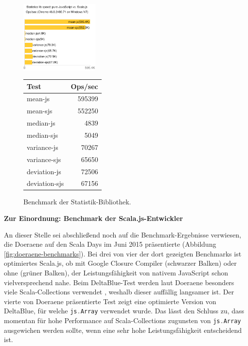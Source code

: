 \documentclass[a4paper, 12pt, hidelinks, listof=totoc, listoftables=totoc, bibliography=totoc]{scrreprt}
\newcommand{\code}[1]{\lstinline[language=Scala, style=inline]|#1|}
\newcommand{\MyMiniSec}[1]{\rmfamily\fontsize{12}{15}\selectfont
	\vspace{7pt}\textbf{#1} %
}
\begin{document}
\begin{figure}[!h]
	\centering
	\includegraphics[width=0.35\textwidth]{statistics-lib/benchmark-statistics-lib-chart}
	\qquad
	\qquad
	\begin{tabular}[b]{|l|r|}
		\hline \textbf{Test} & \textbf{Ops/sec} \\ 
		\hline mean-js       & 595399 \\ 
		\hline mean-sjs      & 552250 \\ 
		\hline median-js     & 4839 \\ 
		\hline median-sjs    & 5049 \\ 
		\hline variance-js   & 70267 \\ 
		\hline variance-sjs  & 65650 \\ 
		\hline deviation-js  & 72506 \\ 
		\hline deviation-sjs & 67156 \\ 
		\hline 
	\end{tabular}
	\captionsetup{labelformat=andtable}
	\caption{Benchmark der Statistik-Bibliothek.}
\end{figure}


\MyMiniSec{Zur Einordnung: Benchmark der Scala.js-Entwickler}

An dieser Stelle sei abschließend noch auf die Benchmark-Ergebnisse verwiesen, die Doeraene auf den Scala Days im Juni 2015 präsentierte (Abbildung \ref{fig:doeraene-benchmarks}). Bei drei von vier der dort gezeigten Benchmarks ist optimiertes Scala.js, ob mit Google Closure Compiler (schwarzer Balken) oder ohne (grüner Balken), der Leistungsfähigkeit von nativem \mbox{JavaScript} schon vielversprechend nahe. Beim DeltaBlue-Test werden laut Doeraene besonders viele Scala-Collections verwendet \cite[Folie 52, Min. 40]{doeraene2015.SSP}, weshalb dieser auffällig langsamer ist. Der vierte von Doeraene präsentierte Test zeigt eine optimierte Version von DeltaBlue, für welche \code{js.Array} verwendet wurde. Das lässt den Schluss zu, dass momentan für hohe Performance auf Scala-Collections zugunsten von \code{js.Array} ausgewichen werden sollte, wenn eine sehr hohe Leistungsfähigkeit entscheidend ist.
\end{document}
